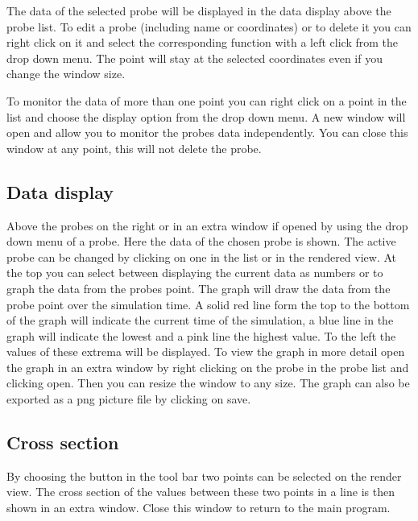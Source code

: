 \documentclass[paper=a4]{proc}
\begin{document}
		The data of the selected probe will be displayed in the data display above the probe list. To edit a probe (including name or coordinates) or to delete it you can right click on it and select the corresponding function with a left click from the drop down menu. The point will stay at the selected coordinates even if you change the window size. 
		
		To monitor the data of more than one point you can right click on a point in the list and choose the display option from the drop down menu. A new window will open and allow you to monitor the probes data independently. You can close this window at any point, this will not delete the probe.
		\subsection{Data display}
		Above the probes on the right or in an extra window if opened by using the drop down menu of a probe. Here the data of the chosen probe is shown. The active probe can be changed by clicking on one in the list or in the rendered view. At the top you can select between displaying the current data as numbers or to graph the data from the probes point. The graph will draw the data from the probe point over the simulation time. A solid red line form the top to the bottom of the graph will indicate the current time of the simulation, a blue line in the graph will indicate the lowest and a pink line the highest value. To the left the values of these extrema will be displayed. To view the graph in more detail open the graph in an extra window by right clicking on the probe in the probe list and clicking open. Then you can resize the window to any size. The graph can also be exported as a png picture file by clicking on save.
		\subsection{Cross section}
		By choosing the button in the tool bar two points can be selected on the render view. The cross section of the values between these two points in a line is then shown in an extra window. Close this window to return to the main program.
\end{document}
